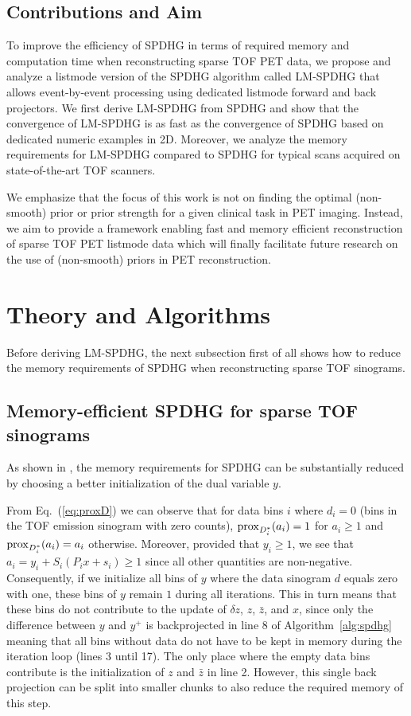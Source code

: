 \subsection*{Contributions and Aim}

To improve the efficiency of SPDHG in terms of required memory and computation time when reconstructing 
sparse TOF PET data, we propose and analyze a listmode version of the SPDHG algorithm  called
LM-SPDHG that allows event-by-event processing using dedicated listmode forward and back projectors.
We first derive LM-SPDHG from SPDHG and show that the convergence of LM-SPDHG is as 
fast as the convergence of SPDHG based on dedicated numeric examples in 2D.
Moreover, we analyze the memory requirements for LM-SPDHG compared to SPDHG for typical scans 
acquired on state-of-the-art TOF scanners.

We emphasize that the focus of this work is not on finding the
optimal (non-smooth) prior or prior strength for a given clinical task in PET imaging.
Instead, we aim to provide a framework enabling fast and memory efficient reconstruction of 
sparse TOF PET listmode data which will finally facilitate future research on the use of
(non-smooth) priors in PET reconstruction. 


\section{Theory and Algorithms}

Before deriving LM-SPDHG, the next subsection first of all shows how to reduce the memory 
requirements of SPDHG when reconstructing sparse TOF sinograms. 

\subsection*{Memory-efficient SPDHG for sparse TOF sinograms}

As shown in \cite{Schramm2021}, the memory requirements for SPDHG can be substantially reduced by 
choosing a better initialization of the dual variable $y$.

From Eq.~(\ref{eq:proxD}) we can observe that for data bins $i$ where $d_i = 0$ 
(bins in the TOF emission sinogram with zero counts), 
$\operatorname{prox}_{D_i^*}(a_i) = 1$ for $a_i \geq 1$ and $\operatorname{prox}_{D_i^*}(a_i) = a_i$ 
otherwise. 
Moreover, provided that $y_i \geq 1$, we see that $ a_i = y_i + S_i (P_i x + s_i) \geq 1$ 
since all other quantities are non-negative. 
Consequently, if we initialize all bins of $y$ where the data sinogram $d$ equals zero with one, 
these bins of $y$ remain $1$ during all iterations. 
This in turn means that these bins do not contribute to the update of $\delta z$, $z$, $\bar{z}$, 
and $x$, since only the difference between
$y$ and $y^+$ is backprojected in line 8 of Algorithm~\ref{alg:spdhg} meaning that all
bins without data do not have to be kept in memory during the iteration loop (lines 3 until 17). 
The only place where the empty data bins contribute is the initialization of $z$ and $\bar{z}$
in line 2.
However, this single back projection can be split into smaller chunks to also reduce
the required memory of this step.


